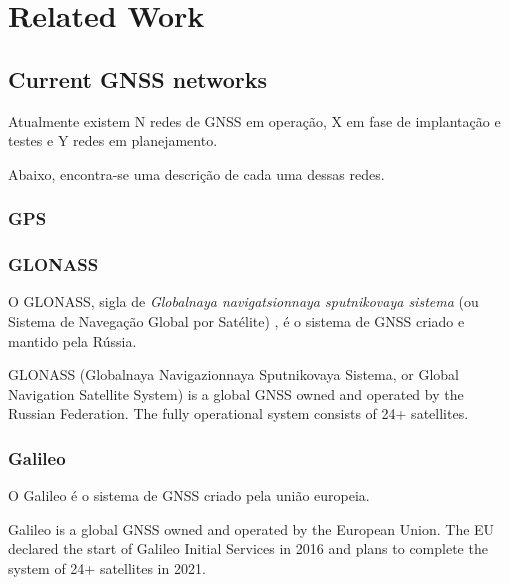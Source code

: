 %
%
%
%
%

%
%
%
%
%

\section{Related Work} \label{sec:related-work}

\subsection{Current GNSS networks}

Atualmente existem N redes de GNSS em operação, X em fase de implantação e testes e Y redes em planejamento.

Abaixo, encontra-se uma descrição de cada uma dessas redes.

\subsubsection{GPS}

\cite{gps}

\subsubsection{GLONASS}

O GLONASS, sigla de \textit{Globalnaya navigatsionnaya sputnikovaya sistema} (ou Sistema de Navegação Global por Satélite) \cite{glonass}, é o sistema de GNSS criado e mantido pela Rússia.

GLONASS (Globalnaya Navigazionnaya Sputnikovaya Sistema, or Global Navigation Satellite System) is a global GNSS owned and operated by the Russian Federation. The fully operational system consists of 24+ satellites.

\subsubsection{Galileo}

O Galileo é o sistema de GNSS criado pela união europeia.

Galileo is a global GNSS owned and operated by the European Union. The EU declared the start of Galileo Initial Services in 2016 and plans to complete the system of 24+ satellites in 2021.

